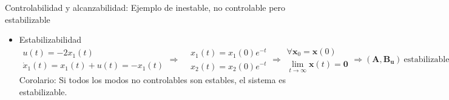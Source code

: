 \documentclass{beamer}
\begin{document}
\begin{frame}{Controlabilidad y alcanzabilidad: Ejemplo de inestable, no controlable pero estabilizable}
\begin{itemize}
        \item Estabilizabilidad
        $$
        \begin{matrix}
            u(t) = -2 x_1(t) \\
            \dot{x}_1(t) = x_1(t) + u(t) = -x_1(t)
        \end{matrix}
        \Rightarrow
        \begin{aligned}
            &x_1(t) = x_1(0) e^{-t} \\
            &x_2(t) = x_2(0) e^{-t}
        \end{aligned}
        \Rightarrow
        \begin{matrix}
            \forall \mathbf{x}_0 = \mathbf{x}(0)\\
            \lim_{t \rightarrow \infty}{\mathbf{x}(t)}=\mathbf{0} 
        \end{matrix}
        \Rightarrow
        (\mathbf{A}, \mathbf{B_u})~\mathrm{estabilizable}
        $$
        Corolario: Si todos los modos no controlables son estables, el sistema es estabilizable.
    \end{itemize}
    
    
\end{frame}
\end{document}
